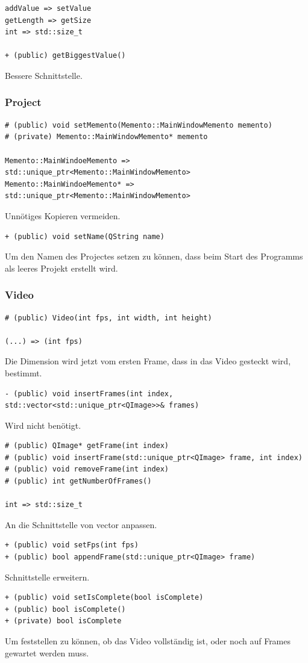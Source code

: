 \documentclass{scrartcl}
\begin{document}
{\begin{verbatim}
addValue => setValue
getLength => getSize
int => std::size_t

+ (public) getBiggestValue()
\end{verbatim}
Bessere Schnittstelle.
\newpage
\subsubsection{Project}
\bigskip
\begin{verbatim}
# (public) void setMemento(Memento::MainWindowMemento memento)
# (private) Memento::MainWindowMemento* memento

Memento::MainWindoeMemento => std::unique_ptr<Memento::MainWindowMemento>
Memento::MainWindoeMemento* => std::unique_ptr<Memento::MainWindowMemento>
\end{verbatim}
Unnötiges Kopieren vermeiden.
\bigskip
\begin{verbatim}
+ (public) void setName(QString name)
\end{verbatim}
Um den Namen des Projectes setzen zu können, dass beim Start des Programms als leeres Projekt erstellt wird.
\bigskip
\subsubsection{Video}
\bigskip
\begin{verbatim}
# (public) Video(int fps, int width, int height)

(...) => (int fps)
\end{verbatim}
Die Dimension wird jetzt vom ersten Frame, dass in das Video gesteckt wird, bestimmt.
\bigskip
\begin{verbatim}
- (public) void insertFrames(int index, std::vector<std::unique_ptr<QImage>>& frames)
\end{verbatim}
Wird nicht benötigt.
\bigskip
\begin{verbatim}
# (public) QImage* getFrame(int index)
# (public) void insertFrame(std::unique_ptr<QImage> frame, int index)
# (public) void removeFrame(int index)
# (public) int getNumberOfFrames()

int => std::size_t
\end{verbatim}
An die Schnittstelle von vector anpassen.
\bigskip
\begin{verbatim}
+ (public) void setFps(int fps)
+ (public) bool appendFrame(std::unique_ptr<QImage> frame)
\end{verbatim}
Schnittstelle erweitern.
\bigskip
\begin{verbatim}
+ (public) void setIsComplete(bool isComplete)
+ (public) bool isComplete()
+ (private) bool isComplete
\end{verbatim}
Um feststellen zu können, ob das Video vollständig ist, oder noch auf Frames gewartet werden muss.
\newpage
}
\end{document}
